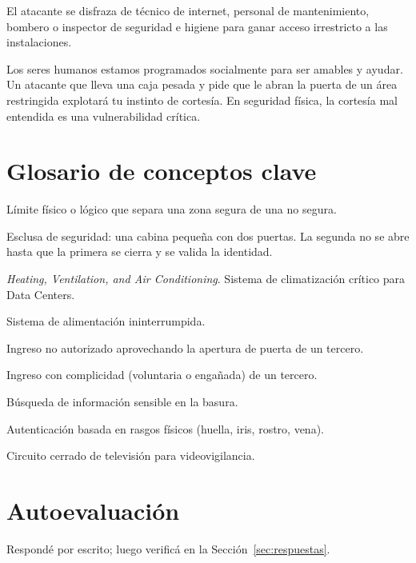 \documentclass[11pt,a4paper]{article}
\begin{document}
\begin{definicion}
El atacante se disfraza de técnico de internet, personal de mantenimiento, bombero o inspector de seguridad e higiene para ganar acceso irrestricto a las instalaciones.
\end{definicion}

\begin{reflexion}
Los seres humanos estamos programados socialmente para ser amables y ayudar. Un atacante que lleva una caja pesada y pide que le abran la puerta de un área restringida explotará tu instinto de cortesía. En seguridad física, la cortesía mal entendida es una vulnerabilidad crítica.
\end{reflexion}

\section{Glosario de conceptos clave}
\begin{description}[leftmargin=!, labelwidth=3.5cm, font=\bfseries]
  \item[Perímetro] Límite físico o lógico que separa una zona segura de una no segura.
  \item[Mantrap] Esclusa de seguridad: una cabina pequeña con dos puertas. La segunda no se abre hasta que la primera se cierra y se valida la identidad.
  \item[HVAC] \textit{Heating, Ventilation, and Air Conditioning}. Sistema de climatización crítico para Data Centers.
  \item[UPS] Sistema de alimentación ininterrumpida.
  \item[Tailgating] Ingreso no autorizado aprovechando la apertura de puerta de un tercero.
  \item[Piggybacking] Ingreso con complicidad (voluntaria o engañada) de un tercero.
  \item[Dumpster Diving] Búsqueda de información sensible en la basura.
  \item[Biometría] Autenticación basada en rasgos físicos (huella, iris, rostro, vena).
  \item[CCTV] Circuito cerrado de televisión para videovigilancia.
\end{description}

\section{Autoevaluación}\label{sec:autoeval}
Respondé por escrito; luego verificá en la Sección~\ref{sec:respuestas}.
\end{document}
